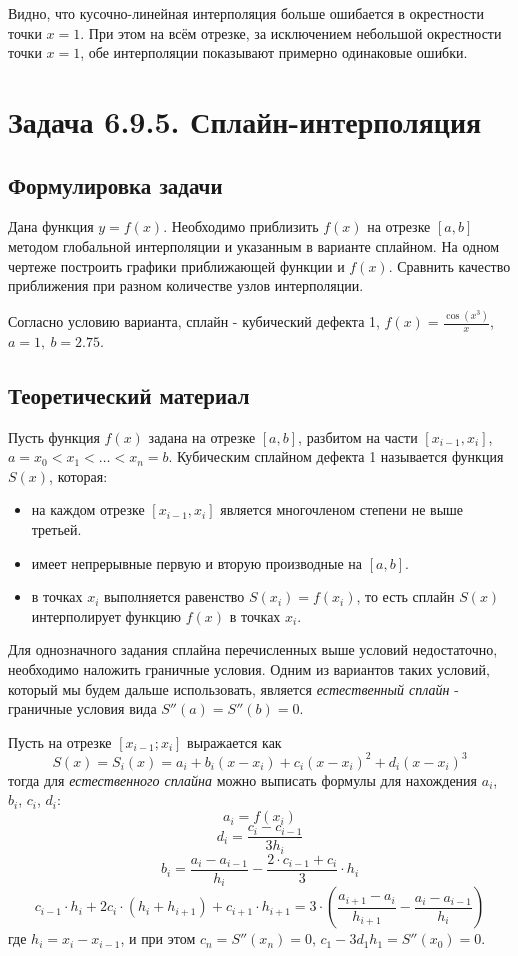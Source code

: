 \documentclass[12pt]{article}%
\begin{document}
Видно, что кусочно-линейная интерполяция больше ошибается в окрестности точки $x = 1$. При этом на всём отрезке, за исключением небольшой окрестности точки $x=1$, обе интерполяции показывают примерно одинаковые ошибки. 



\newpage 
\section{Задача 6.9.5. Сплайн-интерполяция}
\subsection{Формулировка задачи}
Дана функция $y=f(x)$. Необходимо приблизить $f(x)$ на отрезке $[a, b]$ методом глобальной интерполяции и указанным в варианте сплайном. На одном чертеже построить графики приближающей функции и $f(x)$. Сравнить качество приближения при разном количестве узлов интерполяции. 

Согласно условию варианта, сплайн - кубический дефекта 1, $f(x)=\frac{\cos(x^3)}{x}$, $a = 1,\ b = 2.75$.
\subsection{Теоретический материал}
Пусть функция $f(x)$ задана на отрезке $[a, b]$, разбитом на части $[x_{i-1}, x_i]$, $a = x_0 < x_1 < \dots < x_n = b$. Кубическим сплайном дефекта 1 называется функция $S(x)$, которая:
\begin{itemize}
    \item на каждом отрезке $[x_{i-1}, x_i]$ является многочленом степени не выше третьей.
    \item имеет непрерывные первую и вторую производные на $[a, b]$.
    \item в точках $x_i$ выполняется равенство $S(x_i) = f(x_i)$, то есть сплайн $S(x)$ интерполирует функцию $f(x)$ в точках $x_i$.
\end{itemize}
Для однозначного задания сплайна перечисленных выше условий недостаточно, необходимо наложить граничные условия. Одним из вариантов таких условий, который мы будем дальше использовать, является \textit{естественный сплайн} - граничные условия вида $S''(a) = S''(b) = 0$. 

Пусть на отрезке $[x_{i-1}; x_i]$ выражается как 
\[
S(x) = S_i(x) = a_i + b_i (x - x_i) + c_i (x - x_i)^2 + d_i (x - x_i)^3
\]
тогда для \textit{естественного сплайна} можно выписать формулы для нахождения $a_i$, $b_i$, $c_i$, $d_i$:
\[
a_i = f(x_i)
\]
\[
d_i = \frac{c_i - c_{i-1}}{3h_i}
\]
\[
b_i = \frac{a_i - a_{i-1}}{h_i} - 
\frac{2 \cdot c_{i-1} + c_i}{3} \cdot h_i
\]
\[
c_{i-1}\cdot h_i + 2c_i \cdot (h_i + h_{i+1}) + c_{i+1}\cdot h_{i+1} = 
3 \cdot \left(
\frac{a_{i + 1} - a_i}{h_{i + 1}} - \frac{a_i - a_{i-1}}{h_i}
\right)
\]
где $h_i = x_i - x_{i-1}$, и при этом $c_n = S''(x_n)=0$, $c_1 - 3 d_1 h_1 = S''(x_0) = 0$.
\end{document}
